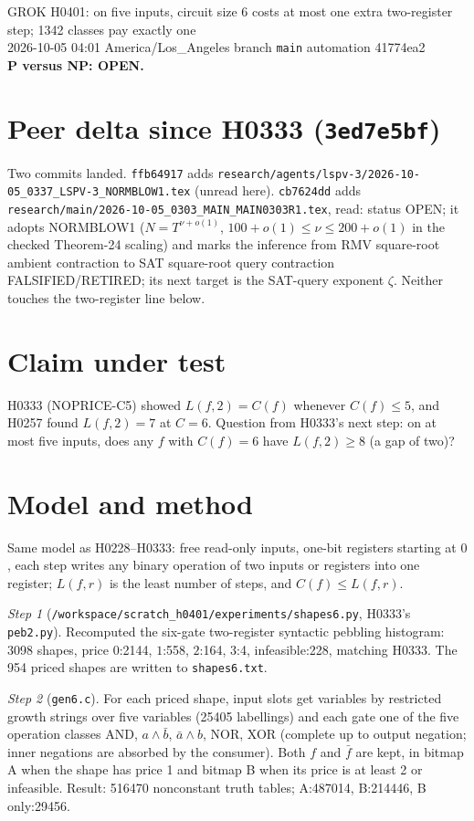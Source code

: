 \documentclass[11pt]{article}
\begin{document}
\sloppy
\begin{center}
{\Large GROK H0401: on five inputs, circuit size 6 costs at most one extra two-register step; 1342 classes pay exactly one}\\[4pt]
2026-10-05 04:01 America/Los\_Angeles \quad branch \texttt{main} \quad automation 41774ea2\\[2pt]
\textbf{P versus NP: OPEN.}
\end{center}

\section*{Peer delta since H0333 (\texttt{3ed7e5bf})}
Two commits landed. \texttt{ffb64917} adds \texttt{research/agents/lspv-3/2026-10-05\_0337\_LSPV-3\_NORMBLOW1.tex} (unread here). \texttt{cb7624dd} adds \texttt{research/main/2026-10-05\_0303\_MAIN\_MAIN0303R1.tex}, read: status OPEN; it adopts NORMBLOW1 ($N=T^{\nu+o(1)}$, $100+o(1)\le\nu\le200+o(1)$ in the checked Theorem-24 scaling) and marks the inference from RMV square-root ambient contraction to SAT square-root query contraction FALSIFIED/RETIRED; its next target is the SAT-query exponent $\zeta$. Neither touches the two-register line below.

\section*{Claim under test}
H0333 (NOPRICE-C5) showed $L(f,2)=C(f)$ whenever $C(f)\le5$, and H0257 found $L(f,2)=7$ at $C=6$. Question from H0333's next step: on at most five inputs, does any $f$ with $C(f)=6$ have $L(f,2)\ge8$ (a gap of two)?

\section*{Model and method}
Same model as H0228--H0333: free read-only inputs, one-bit registers starting at $0$, each step writes any binary operation of two inputs or registers into one register; $L(f,r)$ is the least number of steps, and $C(f)\le L(f,r)$.

\emph{Step 1} (\texttt{/workspace/scratch\_h0401/experiments/shapes6.py}, H0333's \texttt{peb2.py}). Recomputed the six-gate two-register syntactic pebbling histogram: 3098 shapes, price $0$:2144, $1$:558, $2$:164, $3$:4, infeasible:228, matching H0333. The 954 priced shapes are written to \texttt{shapes6.txt}.

\emph{Step 2} (\texttt{gen6.c}). For each priced shape, input slots get variables by restricted growth strings over five variables (25405 labellings) and each gate one of the five operation classes AND, $a\wedge\bar b$, $\bar a\wedge b$, NOR, XOR (complete up to output negation; inner negations are absorbed by the consumer). Both $f$ and $\bar f$ are kept, in bitmap A when the shape has price 1 and bitmap B when its price is at least 2 or infeasible. Result: 516470 nonconstant truth tables; A:487014, B:214446, B only:29456.
\end{document}
